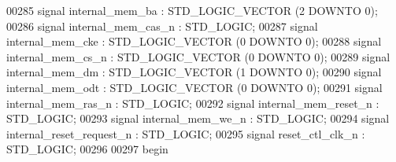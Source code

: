 \begin{DoxyCode}
00285                 \textcolor{keywordflow}{signal} \textcolor{vhdlchar}{internal_mem_ba} \textcolor{vhdlchar}{:}  \textcolor{comment}{STD\_LOGIC\_VECTOR} \textcolor{vhdlchar}{(}\textcolor{vhdllogic}{}\textcolor{vhdllogic}{2} \textcolor{keywordflow}{DOWNTO} \textcolor{vhdllogic}{}\textcolor{vhdllogic}{0}\textcolor{vhdlchar}{)};
00286                 \textcolor{keywordflow}{signal} \textcolor{vhdlchar}{internal_mem_cas_n} \textcolor{vhdlchar}{:}  \textcolor{comment}{STD\_LOGIC};
00287                 \textcolor{keywordflow}{signal} \textcolor{vhdlchar}{internal_mem_cke} \textcolor{vhdlchar}{:}  \textcolor{comment}{STD\_LOGIC\_VECTOR} \textcolor{vhdlchar}{(}\textcolor{vhdllogic}{}\textcolor{vhdllogic}{0} \textcolor{keywordflow}{DOWNTO} \textcolor{vhdllogic}{}\textcolor{vhdllogic}{0}\textcolor{vhdlchar}{)};
00288                 \textcolor{keywordflow}{signal} \textcolor{vhdlchar}{internal_mem_cs_n} \textcolor{vhdlchar}{:}  \textcolor{comment}{STD\_LOGIC\_VECTOR} \textcolor{vhdlchar}{(}\textcolor{vhdllogic}{}\textcolor{vhdllogic}{0} \textcolor{keywordflow}{DOWNTO} \textcolor{vhdllogic}{}\textcolor{vhdllogic}{0}\textcolor{vhdlchar}{)};
00289                 \textcolor{keywordflow}{signal} \textcolor{vhdlchar}{internal_mem_dm} \textcolor{vhdlchar}{:}  \textcolor{comment}{STD\_LOGIC\_VECTOR} \textcolor{vhdlchar}{(}\textcolor{vhdllogic}{}\textcolor{vhdllogic}{1} \textcolor{keywordflow}{DOWNTO} \textcolor{vhdllogic}{}\textcolor{vhdllogic}{0}\textcolor{vhdlchar}{)};
00290                 \textcolor{keywordflow}{signal} \textcolor{vhdlchar}{internal_mem_odt} \textcolor{vhdlchar}{:}  \textcolor{comment}{STD\_LOGIC\_VECTOR} \textcolor{vhdlchar}{(}\textcolor{vhdllogic}{}\textcolor{vhdllogic}{0} \textcolor{keywordflow}{DOWNTO} \textcolor{vhdllogic}{}\textcolor{vhdllogic}{0}\textcolor{vhdlchar}{)};
00291                 \textcolor{keywordflow}{signal} \textcolor{vhdlchar}{internal_mem_ras_n} \textcolor{vhdlchar}{:}  \textcolor{comment}{STD\_LOGIC};
00292                 \textcolor{keywordflow}{signal} \textcolor{vhdlchar}{internal_mem_reset_n} \textcolor{vhdlchar}{:}  \textcolor{comment}{STD\_LOGIC};
00293                 \textcolor{keywordflow}{signal} \textcolor{vhdlchar}{internal_mem_we_n} \textcolor{vhdlchar}{:}  \textcolor{comment}{STD\_LOGIC};
00294                 \textcolor{keywordflow}{signal} \textcolor{vhdlchar}{internal_reset_request_n} \textcolor{vhdlchar}{:}  \textcolor{comment}{STD\_LOGIC};
00295                 \textcolor{keywordflow}{signal} \textcolor{vhdlchar}{reset_ctl_clk_n} \textcolor{vhdlchar}{:}  \textcolor{comment}{STD\_LOGIC};
00296 
00297 \textcolor{vhdlkeyword}{begin}

\end{DoxyCode}
